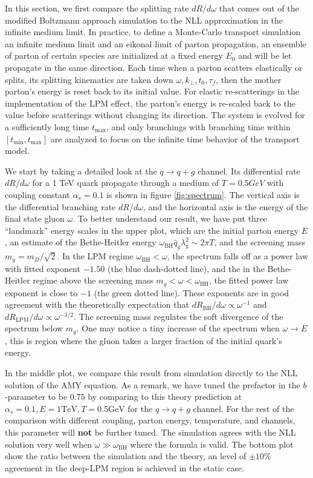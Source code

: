 In this section, we first compare the splitting rate $dR/d\omega$ that comes out of the modified Boltzmann approach simulation to the NLL approximation in the infinite medium limit.
In practice, to define a Monte-Carlo transport simulation an infinite medium limit and an eikonal limit of parton propagation, an ensemble of parton of certain species are initialized at a fixed energy $E_0$ and will be let propagate in the same direction.
Each time when a parton scatters elastically or splits, its splitting kinematics are taken down $\omega, k_\perp, t_0, \tau_f$, then the mother parton's energy is reset back to its initial value.
For elastic re-scatterings in the implementation of the LPM effect, the parton's energy is re-scaled back to the value before scatterings without changing its direction.
The system is evolved for a sufficiently long time $t_{\max}$, and only branchings with branching time within $[t_{\min}, t_{\max}]$ are analyzed to focus on the infinite time behavior of the transport model.

We start by taking a detailed look at the $q\rightarrow q+g$ channel.
Its differential rate $dR/d\omega$ for a 1 TeV quark propagate through a medium of $T=0.5 GeV$ with coupling constant $\alpha_s = 0.1$ is shown in 
figure \ref{fig:spectrum}.
The vertical axis is the differential branching rate $dR/d\omega$, and the horizontal axis is the energy of the final state gluon $\omega$.
To better understand our result, we have put three ``landmark'' energy scales in the upper plot, which are the initial parton energy $E$, an estimate of the Bethe-Heitler energy $\omega_{\textrm{BH}}\hat{q}_g \lambda_g^2 \sim 2\pi T$, and the screening mass $m_g = m_D/\sqrt{2}$.
In the LPM regime $\omega_{\textrm{BH}} < \omega$, the spectrum falls off as a power law with fitted exponent $-1.50$ (the blue dash-dotted line), and the in the Bethe-Heitler regime above the screening mass $m_g < \omega < \omega_{\textrm{BH}}$, the fitted power law exponent is close to $-1$ (the green dotted line).
These exponents are in good agreement with the theoretically expectation that $dR_{\textrm{BH}}/d\omega \propto \omega^{-1}$ and $dR_{\textrm{LPM}}/d\omega \propto \omega^{-3/2}$.
The screening mass regulates the soft divergence of the spectrum below $m_g$.
One may notice a tiny increase of the spectrum when $\omega \rightarrow E$, this is region where the gluon takes a larger fraction of the initial quark's energy.

In the middle plot, we compare this result from simulation directly to the NLL solution of the AMY equation. 
As a remark, we have tuned the prefactor in the $b$-parameter to be $0.75$  by comparing to this theory prediction at $\alpha_s=0.1, E=1 \textrm{TeV}, T = 0.5 \textrm{GeV}$ for the $q\rightarrow q+g$ channel.
For the rest of the comparison with different coupling, parton energy, temperature, and channels, this parameter will {\bf not} be further tuned.
The simulation agrees with the NLL solution very well when $\omega \gg \omega_{\textrm{BH}}$ where the formula is valid.
The bottom plot show the ratio between the simulation and the theory, an level of $\pm 10\%$ agreement in the deep-LPM region is achieved in the static case.

